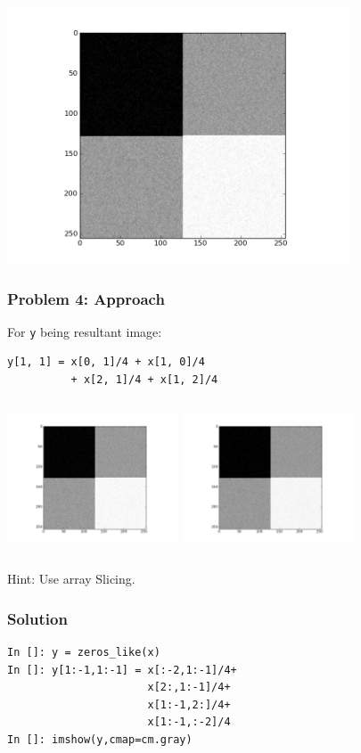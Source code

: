 \documentclass[14pt,compress]{beamer}
\newcommand{\typ}[1]{\texttt{#1}}
\begin{document}
\begin{frame}
  \begin{center}
    \includegraphics[height=3in, interpolate=true]{data/smoothing}    
  \end{center}
\end{frame}

\begin{frame}[fragile]
  \frametitle{Problem 4: Approach}
  For \typ{y} being resultant image:
  \begin{lstlisting}
y[1, 1] = x[0, 1]/4 + x[1, 0]/4 
          + x[2, 1]/4 + x[1, 2]/4    
  \end{lstlisting}
   \begin{columns}
    \hspace*{-0.5in}
    \includegraphics[height=1.5in, interpolate=true]{data/smoothing}
    \hspace*{-0.5in}
    \includegraphics[height=1.5in, interpolate=true]{data/after-filter}
  \end{columns}
   \begin{block}{Hint:}
     Use array Slicing.
   \end{block}
\end{frame}

\begin{frame}[fragile]
  \frametitle{Solution}
  \begin{lstlisting}
In []: y = zeros_like(x)
In []: y[1:-1,1:-1] = x[:-2,1:-1]/4+
                      x[2:,1:-1]/4+
                      x[1:-1,2:]/4+
                      x[1:-1,:-2]/4
In []: imshow(y,cmap=cm.gray)
  \end{lstlisting}
\end{frame}
\end{document}
